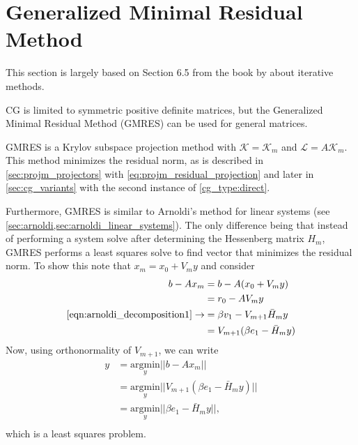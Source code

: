 \section{Generalized Minimal Residual Method}\label{sec:gmres}
This section is largely based on Section 6.5 from the book by \citeauthor{iter_method_saad} about iterative methods.

CG is limited to symmetric positive definite matrices, but the Generalized Minimal Residual Method (GMRES) can be used for general matrices.

GMRES is a Krylov subspace projection method with $\mathcal{K} = \mathcal{K}_m$ and $\mathcal{L} = A\mathcal{K}_m$. This method minimizes the residual norm, as is described in \cref{sec:projm_projectors} with \cref{eq:projm_residual_projection} and later in \cref{sec:cg_variants} with the second instance of \cref{cg_type:direct}.

Furthermore, GMRES is similar to Arnoldi's method for linear systems (see \cref{sec:arnoldi,sec:arnoldi_linear_systems}). The only difference being that instead of performing a system solve after determining the Hessenberg matrix $H_m$, GMRES performs a least squares solve to find vector that minimizes the residual norm. To show this note that $x_m = x_0 + V_m y$ and consider
\begin{align*}
    b - Ax_m                                               & = b - A(x_0  + V_my)               \\
                                                           & = r_0 - AV_my                      \\
    \textrm{\cref{eqn:arnoldi_decomposition1}} \rightarrow & = \beta v_1 - V_{m+1}\bar{H}_m y   \\
                                                           & = V_{m+1}(\beta e_1 - \bar{H}_m y) \\
\end{align*}
Now, using orthonormality of $V_{m+1}$, we can write
\begin{align*}
    y & = \underset{y}{\text{argmin}} ||b - Ax_m||                        \\
      & = \underset{y}{\text{argmin}}||V_{m+1}(\beta e_1 - \bar{H}_m y)|| \\
      & = \underset{y}{\text{argmin}} ||\beta e_1 - \bar{H}_m y||,        \\
\end{align*}
which is a least squares problem.

